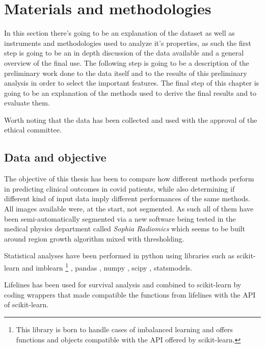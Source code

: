 \chapter{Materials and methodologies}\label{cap: Material_method}
In this section there's going to be an explanation of the dataset as well as instruments and methodologies used to analyze it's properties, as such the first step is going to be an in depth discussion of the data available and a general overview of the final use. The following step is going to be a description of the preliminary work done to the data itself and to the results of this preliminary analysis in order to select the important features. The final step of this chapter is going to be an explanation of the methods used to derive the final results and to evaluate them.

Worth noting that the data has been collected and used with the approval of the ethical committee.

\section{Data and objective}
\label{chap:freefree}
The objective of this thesis has been to compare how different methods perform in predicting clinical outcomes in covid patients, while also determining if different kind of input data imply different performances of the same methods.
All images available were, at the start, not segmented. As such all of them have been semi-automatically segmented via a new software being tested in the medical physics department called \textit{Sophia Radiomics} \cite{Sophiarad} which seems to be built around region growth algorithm mixed with thresholding. 

Statistical analyses have been performed in python using libraries such as scikit-learn \cite{sklearn} and imblearn
\footnote{This library is born to handle cases of imbalanced learning and offers functions and objects compatible with the API offered by scikit-learn.} \cite{imblearn}, pandas \cite{pandas}, numpy \cite{numpy}, scipy \cite{scipy}, statsmodels\cite{statsmodels}.

Lifelines \cite{lifelines} has been used for survival analysis and combined to scikit-learn by coding wrappers that made compatible the functions from lifelines with the API of scikit-learn.

